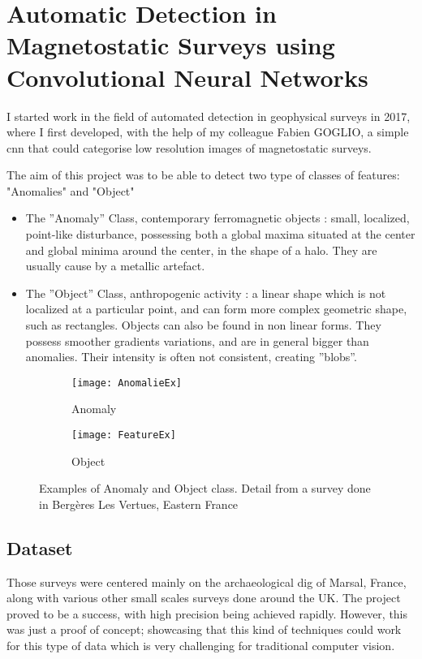 \section{Automatic Detection in Magnetostatic Surveys using Convolutional Neural Networks}
I started work in the field of automated detection in geophysical surveys in 2017, where I first developed, with the help of my colleague Fabien GOGLIO, a simple \gls{cnn} that could categorise low resolution images of magnetostatic surveys. 

The aim of this project was to be able to detect two type of classes of features: "Anomalies" and "Object"

\begin{itemize}
	\item The ”Anomaly” Class, contemporary ferromagnetic objects : small, localized, point-like disturbance, possessing both a global maxima situated at the center and global minima around the center, in the shape of a halo. They are usually cause by a metallic artefact. 
	\item The ”Object” Class, anthropogenic activity : a linear shape which is not localized at a particular point, and can form more complex geometric shape, such as rectangles. Objects can also be found in non linear forms. They possess smoother gradients variations, and are in general bigger than anomalies. Their intensity is often not consistent, creating ”blobs”.
\end{itemize}

\begin{figure}[ht]
	\begin{subfigure}{.5\textwidth}
		\centering
		\texttt{[image: AnomalieEx]}  
		\caption{Anomaly}
		\label{fig:anomalyEx}
	\end{subfigure}
	\begin{subfigure}{.5\textwidth}
		\centering
		\texttt{[image: FeatureEx]}  
		\caption{Object}
		\label{fig:anomalyExample}
	\end{subfigure}
	\caption{Examples of Anomaly and Object class. Detail from a survey done in Bergères Les Vertues, Eastern France}
	\label{fig:exClasses}
\end{figure}

\subsection{Dataset}
Those surveys were centered mainly on the archaeological dig of Marsal, France, along with various other small scales surveys done around the UK. The project proved to be a success, with high precision being achieved rapidly. However, this was just a proof of concept; showcasing that this kind of techniques could work for this type of data which is very challenging for traditional computer vision. 


